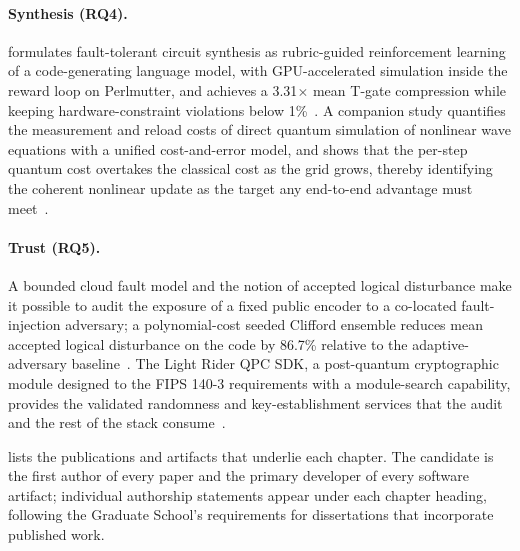 \paragraph{Synthesis (RQ4).}
\rubriq{} formulates fault-tolerant circuit synthesis as rubric-guided reinforcement learning of a code-generating language model, with GPU-accelerated simulation inside the reward loop on Perlmutter, and achieves a 3.31$\times$ mean T-gate compression while keeping hardware-constraint violations below 1\%~\cite{guo2026rubriq}. A companion study quantifies the measurement and reload costs of direct quantum simulation of nonlinear wave equations with a unified cost-and-error model, and shows that the per-step quantum cost overtakes the classical cost as the grid grows, thereby identifying the coherent nonlinear update as the target any end-to-end advantage must meet~\cite{guo2026nonlinearwaves}.

\paragraph{Trust (RQ5).}
A bounded cloud fault model and the notion of accepted logical disturbance make it possible to audit the exposure of a fixed public encoder to a co-located fault-injection adversary; a polynomial-cost seeded Clifford ensemble reduces mean accepted logical disturbance on the  code by 86.7\% relative to the adaptive-adversary baseline~\cite{guo2026qecaudit}. The Light Rider QPC SDK, a post-quantum cryptographic module designed to the FIPS 140-3 requirements with a module-search capability, provides the validated randomness and key-establishment services that the audit and the rest of the stack consume~\cite{guo2026lightriderqpc}.

 lists the publications and artifacts that underlie each chapter. The candidate is the first author of every paper and the primary developer of every software artifact; individual authorship statements appear under each chapter heading, following the Graduate School's requirements for dissertations that incorporate published work.

